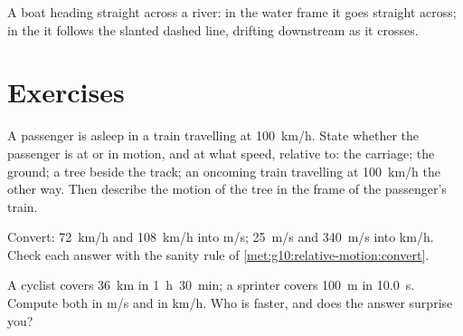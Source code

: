 \begin{omfigure}

{\small A boat heading straight across a river: in the water frame it
goes straight across; in the  it follows the slanted dashed
line, drifting downstream as it crosses.}
\end{omfigure}

\section{Exercises}

\begin{exercise}[$\star$]\label{exo:g10:relative-motion:1}
A passenger is asleep in a train travelling at \qty{100}{km/h}. State
whether the passenger is at  or in motion, and at what speed,
relative to: the carriage; the ground; a tree beside the track; an
oncoming train travelling at \qty{100}{km/h} the other way. Then describe
the motion of the tree in the frame of the passenger's train.
\end{exercise}

\begin{exercise}[$\star$]\label{exo:g10:relative-motion:2}
Convert: \qty{72}{km/h} and \qty{108}{km/h} into \unit{m/s};
\qty{25}{m/s} and \qty{340}{m/s} into \unit{km/h}. Check each answer
with the sanity rule of \cref{met:g10:relative-motion:convert}.
\end{exercise}

\begin{exercise}[$\star$]\label{exo:g10:relative-motion:3}
A cyclist covers \qty{36}{km} in \qty{1}{h}~\qty{30}{min}; a sprinter
covers \qty{100}{m} in \qty{10.0}{s}. Compute both  in
\unit{m/s} and in \unit{km/h}. Who is faster, and does the answer
surprise you?
\end{exercise}

